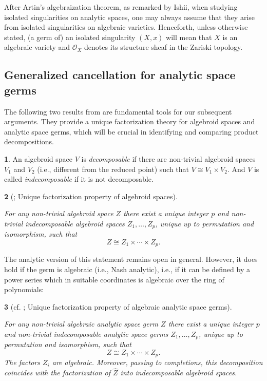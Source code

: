 \documentclass[english,10pt,reqno,twoside]{amsart}
\numberwithin{equation}{section}
\numberwithin{figure}{section}
\theoremstyle{plain}
\newtheorem{thm}{\protect\theoremname}
\theoremstyle{plain}
\theoremstyle{definition}
\newtheorem{defn}[thm]{\protect\defnname}
\providecommand{\theoremname}{Theorem}
\providecommand{\defnname}{Definition}
\theoremstyle{plain}
\numberwithin{equation}{section}
\begin{document}
After Artin's algebraization theorem, as remarked by Ishii, when studying isolated singularities on analytic spaces, one may always assume that they arise from isolated singularities on algebraic varieties. Henceforth, unless otherwise stated, (a germ of) an isolated singularity $(X,x)$ will mean that $X$ is an algebraic variety and $\mathcal{O}_X$ denotes its structure sheaf in the Zariski topology.


\subsection{Generalized cancellation for analytic space germs}\label{subse2.3}
The following two results from \cite{HM1990} are fundamental tools for our subsequent arguments. They provide a unique factorization theory for algebroid spaces and analytic space germs, which will be crucial in identifying and comparing product decompositions.

\begin{defn}
    An algebroid space $V$ is \emph{decomposable} if there are non-trivial algebroid spaces $V_1$ and $V_2$ (i.e., different from the reduced point) such that $V\cong V_1 \times V_2$. And $V$ is called \emph{indecomposable} if it is not decomposable.
\end{defn}

\begin{thm}[{\cite[Theorem 2]{HM1990}}; Unique factorization property of algebroid spaces]\label{Thm: H-M_Unique factorization for algebroid spaces}\mbox{}

For any non-trivial algebroid space $Z$ there exist a unique integer $p$ and non-trivial indecomposable algebroid spaces $Z_1,\ldots,Z_p$, unique up to permutation and isomorphism, such that
\[
Z \cong Z_1 \times \cdots \times Z_p.
\]
\end{thm}

\medskip

The analytic version of this statement remains open in general. However, it does hold if the germ is algebraic (i.e., Nash analytic), i.e., if it can be defined by a power series which in suitable coordinates is algebraic over the ring of polynomials:

\begin{thm}[{cf. \cite[Theorem 3]{HM1990}}; Unique factorization property of algebraic analytic space germs]\label{Thm: H-M_Unique factorization for analytic space germs}\mbox{}

For any non-trivial algebraic analytic space germ $Z$ there exist a unique integer $p$ and non-trivial indecomposable analytic space germs $Z_1,\dots,Z_p$, unique up to permutation and isomorphism, such that
\[
Z \cong Z_1 \times \cdots \times Z_p.
\]
The factors $Z_i$ are algebraic. Moreover, passing to completions, this decomposition coincides with the factorization of $\widehat{Z}$ into indecomposable algebroid spaces.
\end{thm}
\end{document}
